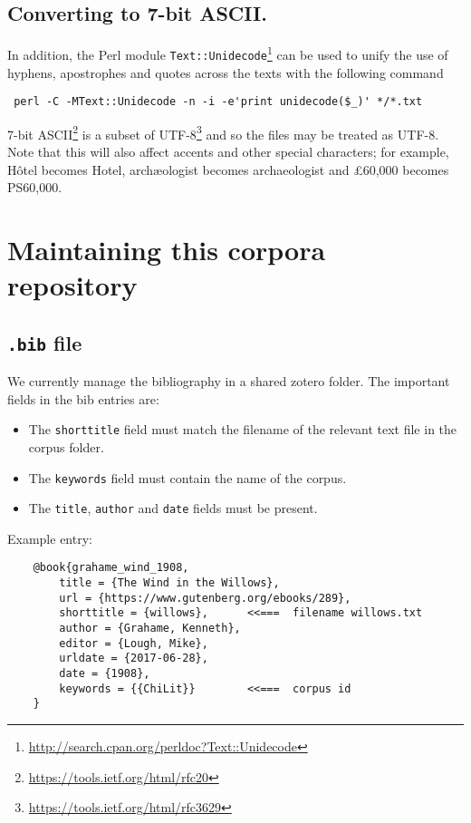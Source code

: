 \documentclass[a4paper,10pt]{paper}
\begin{document}
\subsection{Converting to 7-bit ASCII.}

In addition, the Perl module \texttt{Text::Unidecode}\footnote{\url{http://search.cpan.org/perldoc?Text::Unidecode}} can be used to unify the use of hyphens, apostrophes and quotes across the texts with the following command

\begin{verbatim} perl -C -MText::Unidecode -n -i -e'print unidecode($_)' */*.txt \end{verbatim}

7-bit ASCII\footnote{\url{https://tools.ietf.org/html/rfc20}} is a subset of UTF-8\footnote{\url{https://tools.ietf.org/html/rfc3629}} and so the files may be treated as UTF-8.
Note that this will also affect accents and other special characters; for example, Hôtel becomes Hotel, archæologist becomes archaeologist and £60,000 becomes PS60,000.

\section{Maintaining this corpora repository}
\subsection{\texttt{.bib} file} \label{se:bib_file}
We currently manage the bibliography in a shared zotero folder.
The important fields in the bib entries are:
\begin{itemize}
    \item The \texttt{shorttitle} field must match the filename of the relevant text file in the corpus folder.
    \item The \texttt{keywords} field must contain the name of the corpus.
    \item The \texttt{title}, \texttt{author} and \texttt{date} fields must be present.
\end{itemize}    
Example entry:
\begin{verbatim}
    @book{grahame_wind_1908,
        title = {The Wind in the Willows},
        url = {https://www.gutenberg.org/ebooks/289},
        shorttitle = {willows},      <<===  filename willows.txt
        author = {Grahame, Kenneth},
        editor = {Lough, Mike},
        urldate = {2017-06-28},
        date = {1908},
        keywords = {{ChiLit}}        <<===  corpus id
    }
\end{verbatim}
\end{document}
